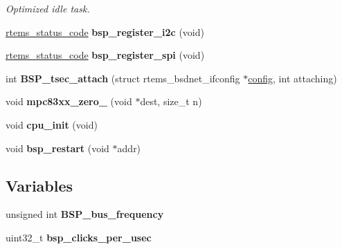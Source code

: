 \begin{DoxyCompactItemize}
\begin{DoxyCompactList}\small\item\em Optimized idle task. \end{DoxyCompactList}\item 
\mbox{\label{group__RTEMSBSPsPowerPCGen83XX_ga58027abea7da23dc91a07af3260fa365}} 
\mbox{\hyperlink{group__ClassicStatus_ga545d41846817eaba6143d52ee4d9e9fe}{rtems\+\_\+status\+\_\+code}} {\bfseries bsp\+\_\+register\+\_\+i2c} (void)
\item 
\mbox{\label{group__RTEMSBSPsPowerPCGen83XX_ga98f0443fb8880a53f25c0f99ba9aa981}} 
\mbox{\hyperlink{group__ClassicStatus_ga545d41846817eaba6143d52ee4d9e9fe}{rtems\+\_\+status\+\_\+code}} {\bfseries bsp\+\_\+register\+\_\+spi} (void)
\item 
\mbox{\label{group__RTEMSBSPsPowerPCGen83XX_ga59edc02dc610b58bf9fb879f63424bdc}} 
int {\bfseries B\+S\+P\+\_\+tsec\+\_\+attach} (struct rtems\+\_\+bsdnet\+\_\+ifconfig $\ast$\mbox{\hyperlink{structconfig__s}{config}}, int attaching)
\item 
\mbox{\label{group__RTEMSBSPsPowerPCGen83XX_gaf8eeb3dfda51546c4ff1b2a5d037297b}} 
void {\bfseries mpc83xx\+\_\+zero\+\_} (void $\ast$dest, size\+\_\+t n)
\item 
\mbox{\label{group__RTEMSBSPsPowerPCGen83XX_ga560ad8614ae03841a10b489f4370bc51}} 
void {\bfseries cpu\+\_\+init} (void)
\item 
\mbox{\label{group__RTEMSBSPsPowerPCGen83XX_ga22e8ff0c484a388835087ab82844fa5b}} 
void {\bfseries bsp\+\_\+restart} (void $\ast$addr)
\end{DoxyCompactItemize}
\subsection*{Variables}
\begin{DoxyCompactItemize}
\item 
\mbox{\label{group__RTEMSBSPsPowerPCGen83XX_gacebd8212ca7912c89b531e7abaeb8389}} 
unsigned int {\bfseries B\+S\+P\+\_\+bus\+\_\+frequency}
\item 
\mbox{\label{group__RTEMSBSPsPowerPCGen83XX_gabfae404b02d5b3193b9420930d97d84a}} 
uint32\+\_\+t {\bfseries bsp\+\_\+clicks\+\_\+per\+\_\+usec}
\end{DoxyCompactItemize}



